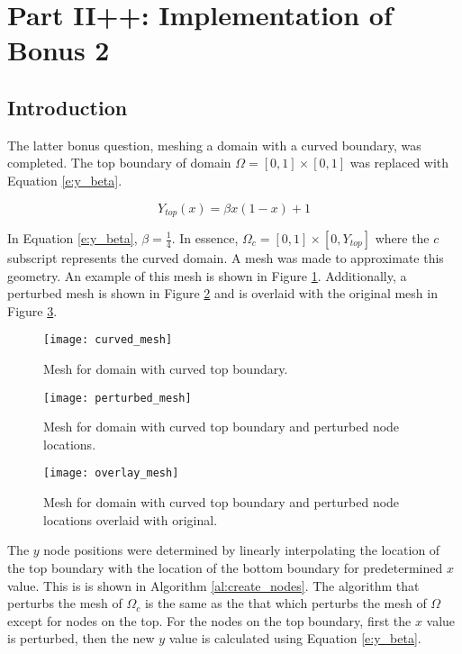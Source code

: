 \documentclass[a4paper, 12pt]{article}
\title{}
\begin{document}
\section*{Part II++: Implementation of Bonus 2}
\subsection{Introduction}\label{sec:intro}
The latter bonus question, meshing a domain with a curved 
boundary, was completed. 
The top boundary of domain $\Omega = [0,1] \times [0,1]$
was replaced with Equation \eqref{e:y_beta}.

\begin{equation} \label{e:y_beta}
Y_{top}(x) = \beta x ( 1 - x) +1
\end{equation}

In Equation \eqref{e:y_beta}, $\beta = \frac{1}{4}$. 
In essence, $\Omega_c = [0, 1] \times [0, Y_{top}]$ where the 
$c$ subscript represents the curved domain.
A mesh was made to approximate this geometry.
An example of this mesh is shown in Figure \ref{fig:mesh}.
Additionally, a perturbed mesh is shown 
in Figure \ref{fig:pMesh} and is overlaid with
the original mesh in Figure \ref{fig:overlap}.

\begin{figure}[H]
  \centering
  \texttt{[image: curved\_mesh]}
  \caption{ Mesh for domain with curved top boundary.}
  \label{fig:mesh}
\end{figure}

\begin{figure}[H]
  \centering
  \texttt{[image: perturbed\_mesh]}
  \caption{ Mesh for domain with curved top boundary 
            and perturbed node locations.}
  \label{fig:pMesh}
\end{figure}

\begin{figure}[H]
  \centering
  \texttt{[image: overlay\_mesh]}
  \caption{ Mesh for domain with curved top boundary 
            and perturbed node locations overlaid
            with original.}
  \label{fig:overlap}
\end{figure}

The $y$ node positions were determined by linearly interpolating the 
location of the top boundary with the location of the bottom boundary
for predetermined $x$ value. 
This is is shown in Algorithm \ref{al:create_nodes}.
The algorithm that perturbs the mesh of $\Omega_c$ is the same
as the that which perturbs the mesh of $\Omega$ except
for nodes on the top. 
For the nodes on the top boundary, first the $x$ value is 
perturbed, then the new $y$ value is calculated using 
Equation \eqref{e:y_beta}.
\end{document}
